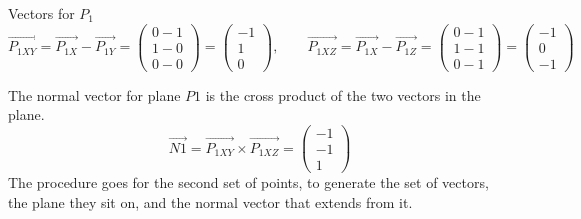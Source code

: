 Vectors for $P_1$
\[
\vec{P_{1XY}} = \vec{P_{1X}} - \vec{P_{1Y}} = 
\begin{pmatrix}
0 - 1 \\ 1 - 0 \\ 0 - 0    
\end{pmatrix} 
= 
\begin{pmatrix}
-1 \\ 1 \\ 0
\end{pmatrix},
\qquad
\vec{P_{1XZ}} = \vec{P_{1X}} - \vec{P_{1Z}} = 
\begin{pmatrix}
0 - 1 \\ 1 - 1 \\ 0 - 1    
\end{pmatrix} 
=
\begin{pmatrix}
-1\\0\\-1
\end{pmatrix}
\]

The normal vector for plane $P1$ is the cross product of the two vectors in the plane.
\[
\vec{N1} =
\vec{P_{1XY}} \times \vec{P_{1XZ}}
=
\begin{pmatrix}
-1\\-1\\1
\end{pmatrix}
\]
The procedure goes for the second set of points, to generate the set of vectors, the plane they sit on, and the 
normal vector that extends from it.

